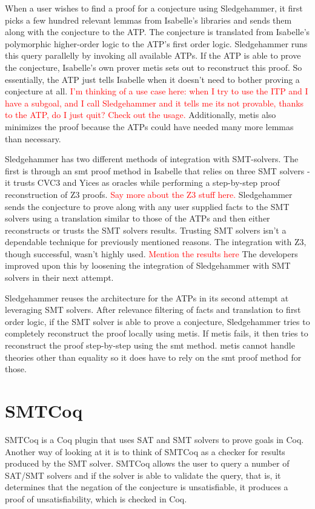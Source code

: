 \documentclass{article}
\begin{document}
	When a user wishes to find a proof for a conjecture using 
	Sledgehammer, it first picks a few hundred relevant 
	lemmas from Isabelle's libraries and sends them along 
	with the conjecture to the ATP. The conjecture is 
	translated from Isabelle's polymorphic higher-order 
	logic to the ATP's first order logic. Sledgehammer 
	runs this query parallelly by invoking all available 
	ATPs. If the ATP is able to prove the conjecture, 
	Isabelle's own prover metis sets out to reconstruct 
	this proof. So essentially, the ATP just tells Isabelle 
	when it doesn't need to bother proving a conjecture at 
	all. \textcolor{red}{I'm thinking of a use case here: 
	when I try to use the ITP and I have a subgoal, and I 
	call Sledgehammer and it tells me its not provable, 
	thanks to the ATP, do I just quit? Check out the usage.}
	Additionally, metis also minimizes the proof because 
	the ATPs could have needed many more lemmas than necessary.
	
	Sledgehammer has two different methods of integration 
	with SMT-solvers. The first is through an smt proof 
	method in Isabelle that relies on three SMT solvers - 
	it trusts CVC3 and Yices as oracles while performing 
	a step-by-step proof reconstruction of Z3 proofs. 
	\textcolor{red}{Say more about the Z3 stuff here.}
	Sledgehammer sends the conjecture to prove along 
	with any user supplied facts to the SMT solvers 
	using a translation similar to those of the ATPs 
	and then either reconstructs or trusts the SMT solvers
	results. Trusting SMT solvers isn't a dependable 
	technique for previously mentioned reasons. The integration
	with Z3, though successful, wasn't highly used. 
	\textcolor{red}{Mention the results here} The developers
	improved upon this by loosening the integration of 
	Sledgehammer with SMT solvers in their next attempt.
	
	Sledgehammer reuses the architecture for the ATPs 
	in its second attempt at leveraging SMT solvers. 
	After relevance filtering of facts and translation to 
	first order logic, if the SMT solver is able to
	prove a conjecture, Sledgehammer tries to completely
	reconstruct the proof locally using metis. If metis fails,
	it then tries to reconstruct the proof step-by-step using 
	the smt method. metis cannot handle theories other 
	than equality so it does have to rely on the smt proof
	method for those.
	
\section{SMTCoq}
\label{sec:cert}
	SMTCoq is a Coq plugin that uses SAT and SMT solvers to 
	prove goals in Coq. Another way of looking at it is 
	to think of SMTCoq as a checker for results produced 
	by the SMT solver. SMTCoq allows the user to query 
	a number of SAT/SMT solvers and if the solver is able 
	to validate the query, that is, it determines that 
	the negation of the conjecture is unsatisfiable, it 
	produces a proof of unsatisfiability, which is checked 
	in Coq.
	
\end{document}
